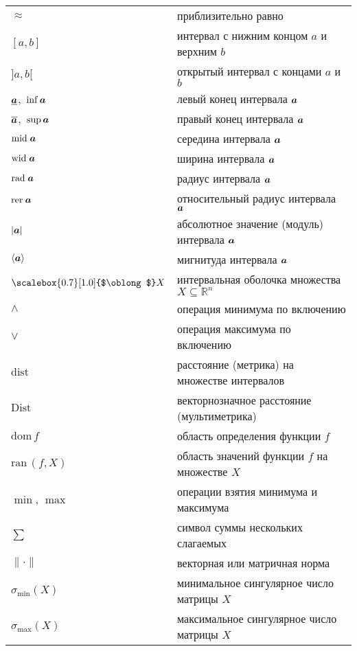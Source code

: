 \documentclass[a5paper,openany]{book}
\newcommand{\mbf}[1]{\protect\text{\boldmath$#1$}}
\newcommand{\mbb}{\mathbb}
\newcommand{\ov}{\overline}
\newcommand{\un}{\underline}
\newcommand{\m}{\mathrm{mid}\;}
\newcommand{\w}{\mathrm{wid}\;}
\newcommand{\ran}{\mathrm{ran}\,}
\newcommand{\rer}{\mathrm{rer}\:}
\newcommand{\dom}{\mathrm{dom}\,}
\newcommand{\dist}{\mathrm{dist}\,}
\newcommand{\Dist}{\mathrm{Dist}\,}
\newcommand{\ih}{\scalebox{0.7}[1.0]{$\oblong$}}
\renewcommand{\r}{\mathrm{rad}\;}
\begin{document}
{\begin{longtable}[c]{ll}
$\approx$     &  приблизительно равно                              \\[3pt]
$[a,b]$       & интервал с нижним концом $a$ и верхним $b$         \\[3pt]
$]a,b[$       & открытый интервал с концами $a$ и $b$              \\[3pt]
$\un{\mbf{a}}$, $\,\inf\mbf{a}$ & левый конец интервала $\mbf{a}$  \\[3pt]
$\ov{\mbf{a}}$, $\,\sup\mbf{a}$ & правый конец интервала $\mbf{a}$ \\[3pt]
$\m\mbf{a}$  & середина интервала $\mbf{a}$                        \\[3pt]
$\w\mbf{a}$  & ширина интервала $\mbf{a}$                          \\[3pt] 
$\r\mbf{a}$  & радиус интервала $\mbf{a}$                          \\[3pt] 
$\rer\mbf{a}$ & относительный радиус интервала $\mbf{a}$           \\[3pt] 
$|\mbf{a}|$  & абсолютное значение (модуль) интервала $\mbf{a}$    \\[3pt] 
$\langle\mbf{a}\rangle$  & мигнитуда интервала $\mbf{a}$           \\[3pt] 
$\ih X$    & интервальная оболочка множества $X\subseteq\mbb{R}^n$ \\[3pt] 
$\wedge$   & операция минимума по включению                        \\[3pt] 
$\vee$     & операция максимума по включению                       \\[3pt] 
$\dist$    & расстояние (метрика) на множестве интервалов          \\[3pt] 
$\Dist$    & векторнозначное расстояние (мультиметрика)            \\[8pt] 
$\dom f$   & область определения функции $f$                       \\[3pt]
$\ran(f, X)$  & область значений функции $f$ на множестве $X$      \\[3pt]
$\min$, $\max$  & операции взятия минимума и максимума             \\[3pt] 
$\sum$          & символ суммы нескольких слагаемых                \\[3pt] 
$\|\cdot\|$     & векторная или матричная норма                    \\[3pt] 
$\sigma_{\min}(X)$ & минимальное сингулярное число матрицы $X$     \\[3pt]      
$\sigma_{\max}(X)$ & максимальное сингулярное число матрицы $X$    \\[8pt]  

\end{longtable}}
\end{document}
